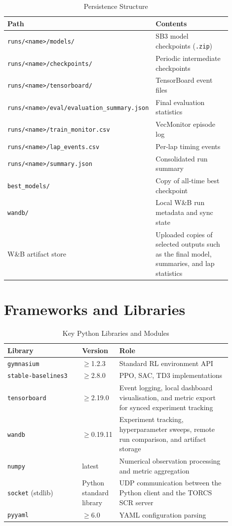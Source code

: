 \begin{table}[H]
  \caption{Persistence Structure}
  \label{tab:artifacts}
  \centering
  \begin{tabular}{p{0.40\linewidth} p{0.50\linewidth}}
    \toprule
    \textbf{Path} & \textbf{Contents} \\
    \midrule
    \texttt{runs/<name>/models/} & SB3 model checkpoints (\texttt{.zip}) \\
    \texttt{runs/<name>/checkpoints/} & Periodic intermediate checkpoints \\
    \texttt{runs/<name>/tensorboard/} & TensorBoard event files \\
    \texttt{runs/<name>/eval/evaluation\_summary.json} & Final evaluation statistics \\
    \texttt{runs/<name>/train\_monitor.csv} & VecMonitor episode log \\
    \texttt{runs/<name>/lap\_events.csv} & Per-lap timing events \\
    \texttt{runs/<name>/summary.json} & Consolidated run summary \\
    \texttt{best\_models/} & Copy of all-time best checkpoint \\
    \texttt{wandb/} & Local W\&B run metadata and sync state \\
    W\&B artifact store & Uploaded copies of selected outputs such as the final model, summaries, and lap statistics \\
    \bottomrule
  \end{tabular}
\end{table}


\section{Frameworks and Libraries}
\label{sec:frameworks}

\begin{table}[H]
  \caption{Key Python Libraries and Modules}
  \label{tab:libs}
  \centering
  \begin{tabular}{p{0.30\linewidth} p{0.15\linewidth} p{0.45\linewidth}}
    \toprule
    \textbf{Library} & \textbf{Version} & \textbf{Role} \\
    \midrule
    \texttt{gymnasium} & $\geq$1.2.3 & Standard RL environment API \\
    \texttt{stable-baselines3} & $\geq$2.8.0 & PPO, SAC, TD3 implementations \\
    \texttt{tensorboard} & $\geq$2.19.0 & Event logging, local dashboard visualisation, and metric export for synced experiment tracking \\
    \texttt{wandb} & $\geq$0.19.11 & Experiment tracking, hyperparameter sweeps, remote run comparison, and artifact storage \\
    \texttt{numpy} & latest & Numerical observation processing and metric aggregation \\
    \texttt{socket} (stdlib) & Python standard library & UDP communication between the Python client and the TORCS SCR server \\
    \texttt{pyyaml} & $\geq$6.0 & YAML configuration parsing \\
    \bottomrule
  \end{tabular}
\end{table}
